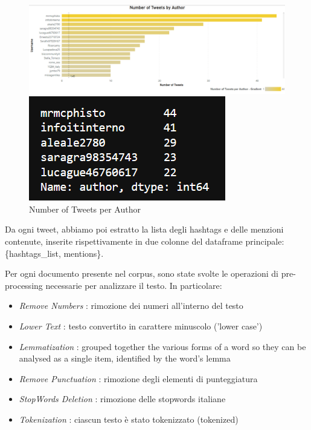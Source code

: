 \documentclass[12pt,journal,compsoc]{IEEEtran}
\begin{document}
\begin{figure}[H]
  \includegraphics[scale=0.4]{./images/tweetsxauthor.png}
  \begin{center}
  \includegraphics[scale=1]{./images/freq-authors.png}
  \end{center}
  \caption{Number of Tweets per Author}
\end{figure}

Da ogni tweet, abbiamo poi estratto la lista degli hashtags e delle menzioni contenute, inserite rispettivamente in due colonne del dataframe principale: \{hashtags\_list, mentions\}.

Per ogni documento presente nel corpus, sono state svolte le operazioni di pre-processing necessarie per analizzare il testo. In particolare:

\begin{itemize}
	\item \textit{Remove Numbers} : rimozione dei numeri all'interno del testo
	\item \textit{Lower Text} : testo convertito in carattere minuscolo ('lower case')
	\item \textit{Lemmatization} : grouped together the various forms of a word so they can be analysed as a single item, identified by the word's lemma
	\item \textit{Remove Punctuation} : rimozione degli elementi di punteggiatura
	\item \textit{StopWords Deletion} : rimozione delle stopwords italiane
	\item \textit{Tokenization} : ciascun testo è stato tokenizzato (tokenized)
\end{itemize}
\end{document}
